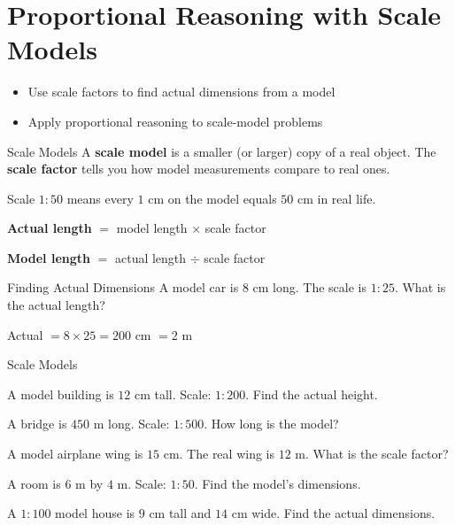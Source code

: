 \section{Proportional Reasoning with Scale Models}

\begin{learningGoals}
\begin{itemize}
    \item Use scale factors to find actual dimensions from a model
    \item Apply proportional reasoning to scale-model problems
\end{itemize}
\end{learningGoals}

\begin{conceptBox}{Scale Models}
A \textbf{scale model} is a smaller (or larger) copy of a real object. The \textbf{scale factor} tells you how model measurements compare to real ones.

Scale $1 : 50$ means every $1$ cm on the model equals $50$ cm in real life.

\textbf{Actual length} $=$ model length $\times$ scale factor

\textbf{Model length} $=$ actual length $\div$ scale factor
\end{conceptBox}

\begin{workedExample}{Finding Actual Dimensions}
A model car is $8$ cm long. The scale is $1 : 25$. What is the actual length?

Actual $= 8 \times 25 = 200$ cm $= 2$ m
\end{workedExample}


\begin{practiceBox}{Scale Models}
\resetProblems

\prob A model building is $12$ cm tall. Scale: $1 : 200$. Find the actual height.

\prob A bridge is $450$ m long. Scale: $1 : 500$. How long is the model?

\prob A model airplane wing is $15$ cm. The real wing is $12$ m. What is the scale factor?

\prob A room is $6$ m by $4$ m. Scale: $1 : 50$. Find the model's dimensions.

\prob A $1 : 100$ model house is $9$ cm tall and $14$ cm wide. Find the actual dimensions.

\end{practiceBox}

